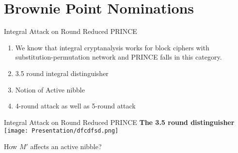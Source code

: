 \section{Brownie Point Nominations}

\begin{frame}{Integral Attack on Round Reduced PRINCE}
\begin{enumerate}
    \item We know that integral cryptanalysis works for block ciphers with substitution-permutation network and PRINCE falls in this category.
    \item 3.5 round integral distinguisher
    \item Notion of Active nibble
    \item 4-round attack as well as 5-round attack
\end{enumerate}

\end{frame}

\begin{frame}{Integral Attack on Round Reduced PRINCE}
\textbf{The 3.5 round distinguisher}
\texttt{[image: Presentation/dfcdfsd.png]}
\begin{center}
How $M'$ affects an active nibble?
\end{center}
\end{frame}

